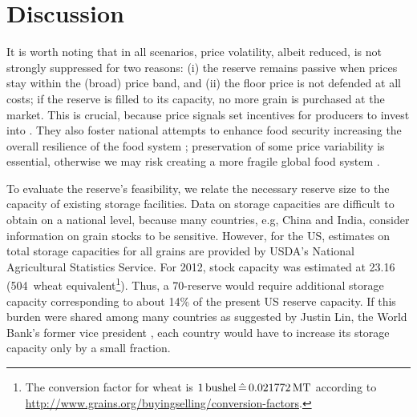 \documentclass[12pt]{article}
\begin{document}
\section{Discussion}
It is worth noting that in all scenarios, price volatility, albeit reduced, is not strongly suppressed for two reasons: (i) the reserve remains passive when prices stay within the (broad) price band, and (ii) the floor price is not defended at all costs; if the reserve is filled to its capacity, no more grain is purchased at the market. This is crucial, because price signals set incentives for producers to invest into \RD. They also foster national attempts to enhance food security increasing the overall resilience of the food system \cite{HLPE11}; preservation of some price variability is essential, otherwise we may risk creating a more fragile global food system \cite{TAL12}.

To evaluate the reserve's feasibility, we relate the necessary reserve size to the capacity of existing storage facilities. Data on storage capacities are difficult to obtain on a national level, because many countries, e.g, China and India, consider information on grain stocks to be sensitive. However, for the US, estimates on total storage capacities for all grains are provided by USDA's National Agricultural Statistics Service. For 2012, stock capacity was estimated at 23.16\bnbushels \cite{NASS14} (504\mmt~wheat equivalent\footnote{The conversion factor for wheat is
  $1\bushel\, \hat{=}\, 0.021772\Mt$ according to
  \url{http://www.grains.org/buyingselling/conversion-factors}.}). Thus, a 70\mmt-reserve would require additional storage capacity corresponding to about 14\% of the present US reserve capacity. If this burden were shared among many countries as suggested by Justin Lin, the World Bank's former vice president \cite{LIN08}, each country would have to increase its storage capacity only by a small fraction.
\end{document}
